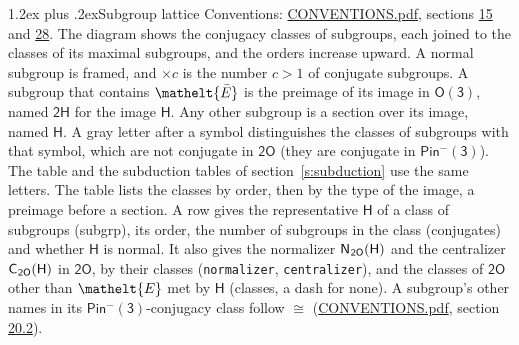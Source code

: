 \documentclass[10pt,a4paper]{article}
\makeatletter
\renewcommand\section{\@startsection{section}{1}{\z@}{-3ex plus -1ex minus -.2ex}%
  {1.2ex plus .2ex}{\normalfont\large\sffamily\bfseries\color{parttitle}}}
\numberwithin{equation}{section}
\newcommand{\eltfont}[1]{{\let\sigma\eltsigma\mathelt{#1}}}
\newcommand{\grp}[1]{\mathsf{#1}}
\newcommand{\cls}[1]{\eltfont{#1}}
\newcommand{\elt}[1]{\eltfont{#1}}
\newcommand{\samecls}{\cong}
\newcommand{\barred}[1]{\bar{#1}}
\newcommand{\hairsp}{\mkern1mu}
\makeatother
\begin{document}
\section{Subgroup lattice}\label{s:subgroups}
Conventions: \href{../../CONVENTIONS.pdf}{CONVENTIONS.pdf}, sections \href{../../../rotation/CONVENTIONS.pdf\#conv.15}{15} and \href{../../CONVENTIONS.pdf\#conv.28}{28}.
The diagram shows the conjugacy classes of subgroups, each joined to the classes of its maximal subgroups, and the orders increase upward. \label{n:index.conjugates.c}\label{n:mark.conjugates}A normal subgroup is framed, and ${\times}c$ is the number $c > 1$ of conjugate subgroups. \label{n:group.H}A subgroup that contains $\elt{\barred{E}}$ is the preimage of its image in $\grp{O(3)}$, named $\grp{2H}$ for the image $\grp{H}$. Any other subgroup is a section over its image, named $\grp{H}$. \label{n:mark.letter}A gray letter after a symbol distinguishes the classes of subgroups with that symbol, which are not conjugate in $\grp{2O}$ (they are conjugate in \href{Pinminus3.pdf}{$\grp{Pin^{-}(3)}$}). The table and the subduction tables of section~\ref{s:subduction} use the same letters. The table lists the classes by order, then by the type of the image, a preimage before a section. \label{n:head.subgroup}\label{n:head.order}\label{n:head.conjugates}\label{n:head.normal}A row gives the representative $\grp{H}$ of a class of subgroups (subgrp), its order, the number of subgroups in the class (conjugates) and whether $\grp{H}$ is normal. \label{n:group.normalizer}\label{n:group.centralizer}\label{n:head.classes}It also gives the normalizer $\grp{N}_{\hairsp \grp{2O}}(\grp{H})$ and the centralizer $\grp{C}_{\hairsp \grp{2O}}(\grp{H})$ in $\grp{2O}$, by their classes (\texttt{normalizer}, \texttt{centralizer}), and the classes of $\grp{2O}$ other than $\cls{E}$ met by $\grp{H}$ (classes, a dash for none). A subgroup's other names in its \href{Pinminus3.pdf}{$\grp{Pin^{-}(3)}$}-conjugacy class follow $\samecls$ (\href{../../CONVENTIONS.pdf}{CONVENTIONS.pdf}, section \href{../../CONVENTIONS.pdf\#conv.20.2}{20.2}).
\end{document}
